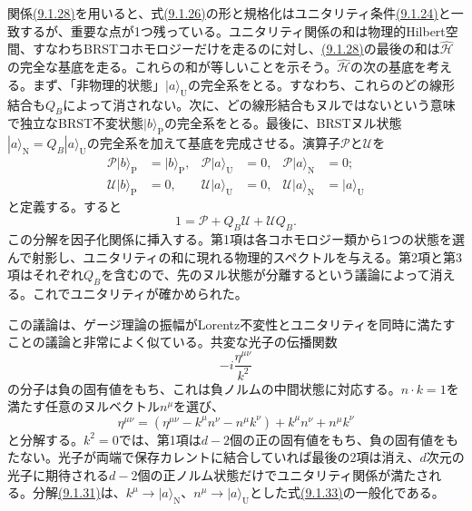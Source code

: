 関係\hyperref[eq:9.1.28]{(9.1.28)}を用いると、式\hyperref[eq:9.1.26]{(9.1.26)}の形と規格化はユニタリティ条件\hyperref[eq:9.1.24]{(9.1.24)}と一致するが、重要な点が1つ残っている。ユニタリティ関係の和は物理的Hilbert空間、すなわちBRSTコホモロジーだけを走るのに対し、\hyperref[eq:9.1.28]{(9.1.28)}の最後の和は$\widehat{\mathcal H}$の完全な基底を走る。これらの和が等しいことを示そう。$\widehat{\mathcal H}$の次の基底を考える。まず、「非物理的状態」$|a\rangle_{\mathrm U}$の完全系をとる。すなわち、これらのどの線形結合も$Q_B$によって消されない。次に、どの線形結合もヌルではないという意味で独立なBRST不変状態$|b\rangle_{\mathrm P}$の完全系をとる。最後に、BRSTヌル状態$|a\rangle_{\mathrm N}=Q_B|a\rangle_{\mathrm U}$の完全系を加えて基底を完成させる。演算子$\mathcal P$と$\mathcal U$を
\begin{align}
 \mathcal P|b\rangle_{\mathrm P}&=|b\rangle_{\mathrm P},&
 \mathcal P|a\rangle_{\mathrm U}&=0,&
 \mathcal P|a\rangle_{\mathrm N}&=0;
 \tag{9.1.30a}\label{eq:9.1.30a}\\
 \mathcal U|b\rangle_{\mathrm P}&=0,&
 \mathcal U|a\rangle_{\mathrm U}&=0,&
 \mathcal U|a\rangle_{\mathrm N}&=|a\rangle_{\mathrm U}
 \tag{9.1.30b}\label{eq:9.1.30b}
\end{align}
と定義する。すると
\begin{equation}
 1=\mathcal P+Q_B\mathcal U+\mathcal UQ_B.
 \tag{9.1.31}\label{eq:9.1.31}
\end{equation}
この分解を因子化関係に挿入する。第1項は各コホモロジー類から1つの状態を選んで射影し、ユニタリティの和に現れる物理的スペクトルを与える。第2項と第3項はそれぞれ$Q_B$を含むので、先のヌル状態が分離するという議論によって消える。これでユニタリティが確かめられた。

この議論は、ゲージ理論の振幅がLorentz不変性とユニタリティを同時に満たすことの議論と非常によく似ている。共変な光子の伝播関数
\begin{equation}
 -i\frac{\eta^{\mu\nu}}{k^2}
 \tag{9.1.32}\label{eq:9.1.32}
\end{equation}
の分子は負の固有値をもち、これは負ノルムの中間状態に対応する。$n\cdot k=1$を満たす任意のヌルベクトル$n^\mu$を選び、
\begin{equation}
 \eta^{\mu\nu}=(\eta^{\mu\nu}-k^\mu n^\nu-n^\mu k^\nu)
 +k^\mu n^\nu+n^\mu k^\nu
 \tag{9.1.33}\label{eq:9.1.33}
\end{equation}
と分解する。$k^2=0$では、第1項は$d-2$個の正の固有値をもち、負の固有値をもたない。光子が両端で保存カレントに結合していれば最後の2項は消え、$d$次元の光子に期待される$d-2$個の正ノルム状態だけでユニタリティ関係が満たされる。分解\hyperref[eq:9.1.31]{(9.1.31)}は、$k^\mu\to|a\rangle_{\mathrm N}$、$n^\mu\to|a\rangle_{\mathrm U}$とした式\hyperref[eq:9.1.33]{(9.1.33)}の一般化である。

